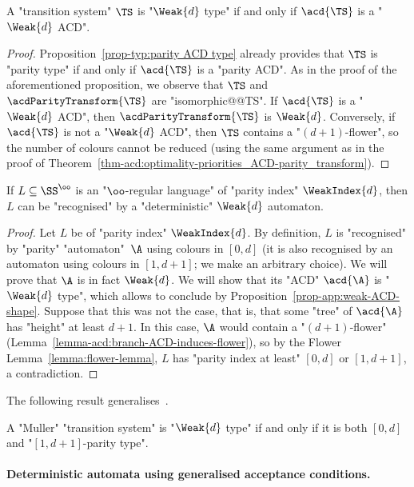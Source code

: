 \documentclass{theoretics}
\begin{document}
\begin{proposition}\label{prop-app:weak-ACD-shape}
	A "transition system" $\TS$ is "$\Weak{d}$ type" if and only if $\acd{\TS}$ is a "$\Weak{d}$ ACD".
\end{proposition}
\begin{proof}
	Proposition~\ref{prop-typ:parity ACD type} already provides that $\TS$ is "parity type" if and only if $\acd{\TS}$ is a "parity ACD". As in the proof of the aforementioned proposition, we observe that $\TS$ and $\acdParityTransform{\TS}$ are "isomorphic@@TS". If $\acd{\TS}$ is a "$\Weak{d}$ ACD", then $\acdParityTransform{\TS}$ is $\Weak{d}$. Conversely, if $\acd{\TS}$ is not a "$\Weak{d}$ ACD", then $\TS$ contains a "$(d+1)$-flower", so the number of colours cannot be reduced (using the same argument as in the proof of Theorem~\ref{thm-acd:optimality-priorities_ACD-parity_transform}).
\end{proof}


\begin{corollary}\label{cor-app:weak-automata-weaktype}
	If $L\subseteq \SS^\oo$ is an "$\oo$-regular language" of "parity index" $\WeakIndex{d}$, then $L$ can be "recognised" by a "deterministic" $\Weak{d}$ automaton.
\end{corollary}
\begin{proof}
	Let $L$ be of "parity index" $\WeakIndex{d}$. By definition, $L$ is "recognised" by "parity" "automaton"~$\A$ using colours in $[0,d]$ (it is also recognised by an automaton using colours in $[1,d+1]$; we make an arbitrary choice). We will prove that $\A$ is in fact $\Weak{d}$. We will show that its "ACD" $\acd{\A}$ is "$\Weak{d}$ type", which allows to conclude by Proposition~\ref{prop-app:weak-ACD-shape}.
	Suppose that this was not the case, that is, that some "tree" of $\acd{\A}$ has "height" at least $d+1$. In this case, $\A$ would contain a "$(d+1)$-flower" (Lemma~\ref{lemma-acd:branch-ACD-induces-flower}), so by the Flower Lemma~\ref{lemma:flower-lemma}, $L$ has "parity index at least" $[0,d]$ or $[1,d+1]$, a contradiction.
\end{proof}

The following result generalises~\cite[Theorem~2]{BSW01Weakautomata}.
\begin{corollary}
	A "Muller" "transition system" is "$\Weak{d}$ type" if and only if it is both $[0,d]$ and "$[1,d+1]$-parity type".
\end{corollary}



\paragraph*{Deterministic automata using generalised acceptance conditions.}
\end{document}
